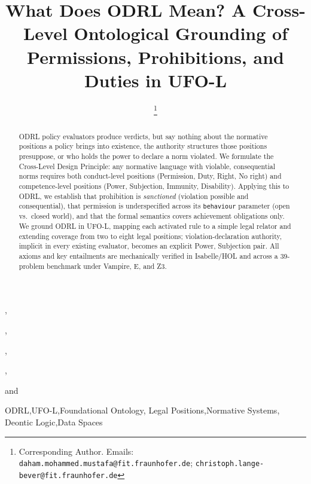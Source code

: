 \documentclass{IOS-Book-Article}
\theoremstyle{definition}
\def\hb{\hbox to 11.5 cm{}}
\begin{document}
\pagestyle{headings}
\def\thepage{}
\begin{frontmatter}           
\title{What Does ODRL Mean? A Cross-Level Ontological Grounding of Permissions, Prohibitions, and Duties 
in UFO-L}
\markboth{}{D.M. Mustafa et al.\hb}
\author[A]{ %
\thanks{Corresponding Author. Emails:
\texttt{daham.mohammed.mustafa@fit.fraunhofer.de};
\texttt{christoph.lange-bever@fit.fraunhofer.de}}},
\author[A]{ },
\author[B]{ },
\author[A,D]{ },
\author[B]{ }
and
\author[A,C]{ }
\address[A]{Fraunhofer FIT, Sankt Augustin, Germany}
\address[B]{University of Twente, The Netherlands}
\address[D]{Universidad Privada Boliviana, Bolivia}
\address[C]{RWTH Aachen University, Aachen, Germany}
\begin{abstract}
ODRL policy evaluators produce verdicts, but say nothing about the normative positions a policy brings into existence, the authority structures those positions presuppose, or who holds the power to declare a norm violated.
We formulate the Cross-Level Design Principle: any normative language
with violable, consequential norms requires both conduct-level
positions (Permission, Duty, Right, No right) and competence-level
positions (Power, Subjection, Immunity, Disability).
Applying this to ODRL, we establish that prohibition is
\emph{sanctioned} (violation possible and consequential), that
permission is underspecified across its \texttt{behaviour}
parameter (open vs.\ closed world), and that the formal semantics
covers achievement obligations only.
We ground ODRL in UFO-L, mapping each activated rule to a simple
legal relator and extending coverage from two to eight legal
positions; violation-declaration authority, implicit in every
existing evaluator, becomes an explicit Power, Subjection pair.
All axioms and key entailments are mechanically verified in
Isabelle/HOL and across a 39-problem benchmark
under Vampire, E, and Z3.
\end{abstract}

\begin{keyword}
ODRL\sep UFO-L\sep Foundational Ontology\sep
Legal Positions\sep Normative Systems\sep
Deontic Logic\sep Data Spaces
\end{keyword}
\end{frontmatter}
\end{document}
